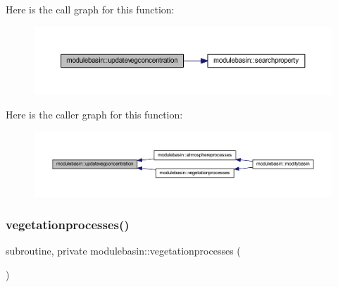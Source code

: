 Here is the call graph for this function\+:\nopagebreak
\begin{figure}[H]
\begin{center}
\leavevmode
\includegraphics[width=350pt]{namespacemodulebasin_a73f54ad66e54b432898b7261a7ba0969_cgraph}
\end{center}
\end{figure}
Here is the caller graph for this function\+:\nopagebreak
\begin{figure}[H]
\begin{center}
\leavevmode
\includegraphics[width=350pt]{namespacemodulebasin_a73f54ad66e54b432898b7261a7ba0969_icgraph}
\end{center}
\end{figure}
\mbox{\label{namespacemodulebasin_a8345c242b1aed1c95c3779596054b89f}} 
\subsubsection{\texorpdfstring{vegetationprocesses()}{vegetationprocesses()}}
{\footnotesize\ttfamily subroutine, private modulebasin\+::vegetationprocesses (\begin{DoxyParamCaption}{ }\end{DoxyParamCaption})\hspace{0.3cm}{\ttfamily [private]}}


